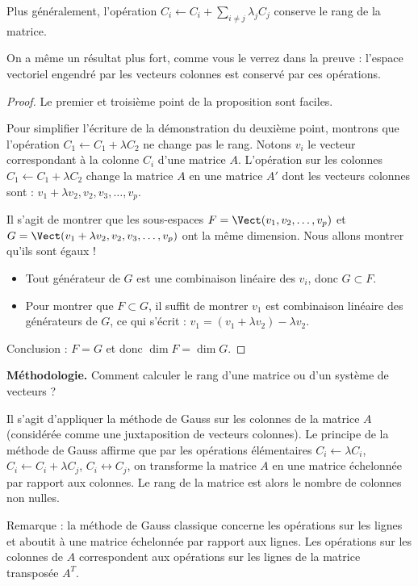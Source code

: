 \documentclass[class=report,crop=false]{standalone}
\begin{document}
Plus généralement, l'opération
$C_i \leftarrow C_i + \sum_{i\neq j} \lambda_j C_j$
conserve le rang de la matrice.

On a même un résultat plus fort, comme vous le verrez dans la preuve :
l'espace vectoriel engendré par les vecteurs colonnes est conservé
par ces opérations.




\begin{proof}
Le premier et troisième point de la proposition sont faciles.

Pour simplifier l'écriture de la démonstration du deuxième point, montrons que l'opération
$C_1 \leftarrow C_1 + \lambda C_2$ ne change pas le rang.
Notons $v_i$ le vecteur correspondant à la colonne $C_i$ d'une matrice $A$.
L'opération sur les colonnes $C_1 \leftarrow C_1 + \lambda C_2$ change la matrice
$A$ en une matrice $A'$ dont les vecteurs colonnes sont :
$v_1+\lambda v_2, v_2,v_3,\ldots,v_p$.

Il s'agit de montrer que les sous-espaces $F = \Vect(v_1,v_2,\ldots,v_p)$
et $G = \Vect(v_1+\lambda v_2, v_2,v_3,\ldots,v_p)$ ont la même dimension.
Nous allons montrer qu'ils sont égaux !

\begin{itemize}
  \item Tout générateur de $G$ est une combinaison linéaire des $v_i$, donc $G \subset F$.

  \item Pour montrer que $F \subset G$, il suffit de montrer $v_1$ est combinaison linéaire des générateurs
  de $G$, ce qui s'écrit : $v_1 = (v_1+\lambda v_2) - \lambda v_2$.
\end{itemize}

Conclusion : $F=G$ et donc $\dim F=\dim G$.
\end{proof}

\textbf{Méthodologie.} Comment calculer le rang d'une matrice ou d'un système de vecteurs ?

Il s'agit d'appliquer la méthode de Gauss sur les colonnes de la matrice $A$
(considérée comme une juxtaposition de vecteurs colonnes).
Le principe de la méthode de Gauss affirme que par les opérations élémentaires
$C_i \leftarrow \lambda C_i$,
$C_i \leftarrow C_i+\lambda C_j$,
$C_i \leftrightarrow C_j$, on transforme la matrice $A$ en une matrice échelonnée
par rapport aux colonnes.
Le rang de la matrice est alors le nombre de colonnes non nulles.

Remarque : la méthode de Gauss classique concerne les opérations sur les lignes
et aboutit à une matrice échelonnée par rapport aux lignes.
Les opérations sur les colonnes de $A$ correspondent aux opérations sur les lignes de la matrice
transposée $A^T$.
\end{document}
